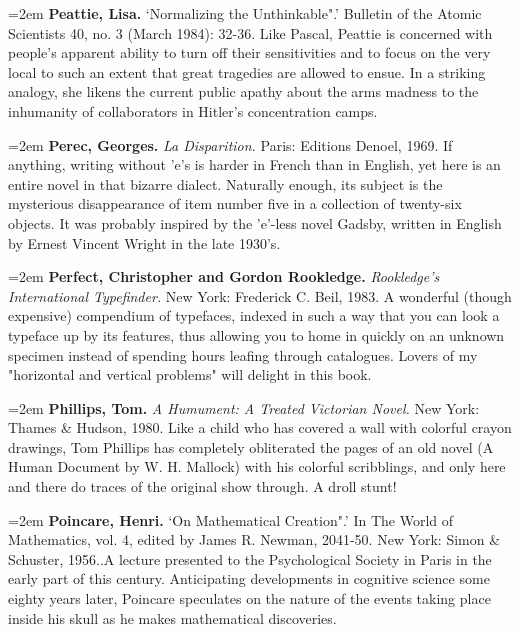 \par\noindent\hangindent=2em {\bf Peattie, Lisa.} `Normalizing the Unthinkable".' Bulletin of the Atomic Scientists 40, no. 3 (March 1984): 32-36. Like Pascal, Peattie is concerned with people's apparent ability to turn off their sensitivities and to focus on the very local to such an extent that great tragedies are allowed to ensue. In a striking analogy, she likens the current public apathy about the arms madness to the inhumanity of collaborators in Hitler's concentration camps.

\par\noindent\hangindent=2em {\bf Perec, Georges.} {\it La Disparition.} Paris: Editions Denoel, 1969. If anything, writing without 'e's is harder in French than in English, yet here is an entire novel in that bizarre dialect. Naturally enough, its subject is the mysterious disappearance of item number five in a collection of twenty-six objects. It was probably inspired by the 'e'-less novel Gadsby, written in English by Ernest Vincent Wright in the late 1930's.

\par\noindent\hangindent=2em {\bf Perfect, Christopher and Gordon Rookledge.} {\it Rookledge's International Typefinder.} New York: Frederick C. Beil, 1983. A wonderful (though expensive) compendium of typefaces, indexed in such a way that you can look a typeface up by its features, thus allowing you to home in quickly on an unknown specimen instead of spending hours leafing through catalogues. Lovers of my "horizontal and vertical problems" will delight in this book.

\par\noindent\hangindent=2em {\bf Phillips, Tom.} {\it A Humument: A Treated Victorian Novel.} New York: Thames \& Hudson, 1980. Like a child who has covered a wall with colorful crayon drawings, Tom Phillips has completely obliterated the pages of an old novel (A Human Document by W. H. Mallock) with his colorful scribblings, and only here and there do traces of the original show through. A droll stunt!

\par\noindent\hangindent=2em {\bf Poincare, Henri.} `On Mathematical Creation".' In The World of Mathematics, vol. 4, edited by James R. Newman, 2041-50. New York: Simon \& Schuster, 1956..A lecture presented to the Psychological Society in Paris in the early part of this century. Anticipating developments in cognitive science some eighty years later, Poincare speculates on the nature of the events taking place inside his skull as he makes mathematical discoveries.

